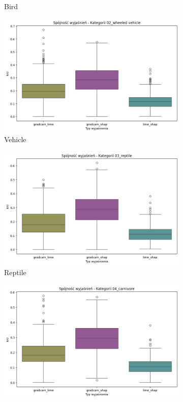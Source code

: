 \begin{figure}
\begin{subfigure}[b]{0.3\textwidth}
		\caption{Bird}  \label{}
	\end{subfigure}
	\begin{subfigure}[b]{0.3\textwidth}
		\centering\includegraphics[width=.9\textwidth]{img/base_coherence_vehicle}
		\caption{Vehicle}  \label{}
	\end{subfigure}
	\begin{subfigure}[b]{0.3\textwidth}
		\centering\includegraphics[width=.9\textwidth]{img/base_coherence_reptile}
		\caption{Reptile}  \label{}
	\end{subfigure}
	\begin{subfigure}[b]{0.3\textwidth}
		\centering\includegraphics[width=.9\textwidth]{img/base_coherence_carnivore}

\end{subfigure}
\end{figure}
